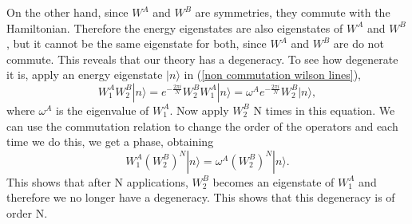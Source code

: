 \documentclass{article}
\begin{document}
On the other hand, since $W^A$ and $W^B$ are symmetries, they commute with the Hamiltonian. Therefore the energy eigenstates are also eigenstates of $W^A$ and $W^B$, but it cannot be the same eigenstate for both, since $W^A$ and $W^B$ are do not commute. This reveals that our theory has a degeneracy. To see how degenerate it is, apply an energy eigenstate $|n\rangle$ in (\ref{non commutation wilson lines}), 
\begin{equation}\label{non commutation wilson lines}
	W_1^AW_2^B|n\rangle=e^{-\frac{2\pi i}{N}}W_2^BW_1^A|n\rangle=\omega^Ae^{-\frac{2\pi i}{N}}W_2^B|n\rangle, 
\end{equation}
where $\omega^A$ is the eigenvalue of $W_1^A$. Now apply $W_2^B$ N times in this equation. We can use the commutation relation to change the order of the operators and each time we do this, we get a phase, obtaining 
\begin{equation}
	W_1^A(W_2^B)^N|n\rangle=\omega^A(W_2^B)^N|n\rangle.
\end{equation}
This shows that after N applications, $W_2^B$ becomes an eigenstate of $W_1^A$ and therefore we no longer have a degeneracy. This shows that this degeneracy is of order N.

\nocite{*}


\end{document}

